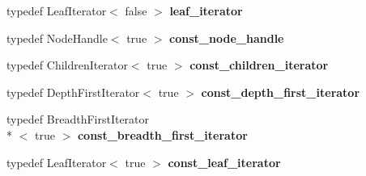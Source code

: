 \begin{DoxyCompactItemize}
\item 
\hypertarget{class_d_o_1_1_tree_adbbdf19f38b14d4da76d1614be080d00}{typedef Leaf\-Iterator$<$ false $>$ {\bfseries leaf\-\_\-iterator}}\label{class_d_o_1_1_tree_adbbdf19f38b14d4da76d1614be080d00}

\item 
\hypertarget{class_d_o_1_1_tree_ae753899577d159fa4affc363db9732fa}{typedef Node\-Handle$<$ true $>$ {\bfseries const\-\_\-node\-\_\-handle}}\label{class_d_o_1_1_tree_ae753899577d159fa4affc363db9732fa}

\item 
\hypertarget{class_d_o_1_1_tree_ae66bc4ac2dc4f6a2911f3c681a87edd6}{typedef Children\-Iterator$<$ true $>$ {\bfseries const\-\_\-children\-\_\-iterator}}\label{class_d_o_1_1_tree_ae66bc4ac2dc4f6a2911f3c681a87edd6}

\item 
\hypertarget{class_d_o_1_1_tree_a988b24ed2ea871f299c7b57b793d8284}{typedef Depth\-First\-Iterator$<$ true $>$ {\bfseries const\-\_\-depth\-\_\-first\-\_\-iterator}}\label{class_d_o_1_1_tree_a988b24ed2ea871f299c7b57b793d8284}

\item 
\hypertarget{class_d_o_1_1_tree_abf6d39fccb2d13ee71f1b66dbafbd851}{typedef Breadth\-First\-Iterator\\*
$<$ true $>$ {\bfseries const\-\_\-breadth\-\_\-first\-\_\-iterator}}\label{class_d_o_1_1_tree_abf6d39fccb2d13ee71f1b66dbafbd851}

\item 
\hypertarget{class_d_o_1_1_tree_a61229ff3e7defea14d8fb68f94cc9ae6}{typedef Leaf\-Iterator$<$ true $>$ {\bfseries const\-\_\-leaf\-\_\-iterator}}\label{class_d_o_1_1_tree_a61229ff3e7defea14d8fb68f94cc9ae6}

\end{DoxyCompactItemize}
